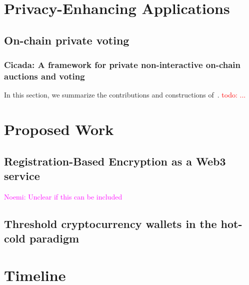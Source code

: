 \documentclass{article}
\newcommand{\noemi}[1]{\textcolor{magenta}{Noemi: #1}}
\newcommand{\todo}[1]{\textcolor{red}{todo: #1}}
\begin{document}
\section{Privacy-Enhancing Applications}\label{sec:applications}

\subsection{On-chain private voting}

\subsubsection{Cicada: A framework for private non-interactive on-chain auctions and voting~\texorpdfstring{\cite{EPRINT:GSZB23}}{[GSZB23]}}

In this section, we summarize the contributions and constructions of~\cite{EPRINT:GSZB23}. \todo{...}

\section{Proposed Work}\label{sec:proposed}

\subsection{Registration-Based Encryption as a Web3 service}
\noemi{Unclear if this can be included}

\subsection{Threshold cryptocurrency wallets in the hot-cold paradigm}


\section{Timeline}

{\small


}
\end{document}
